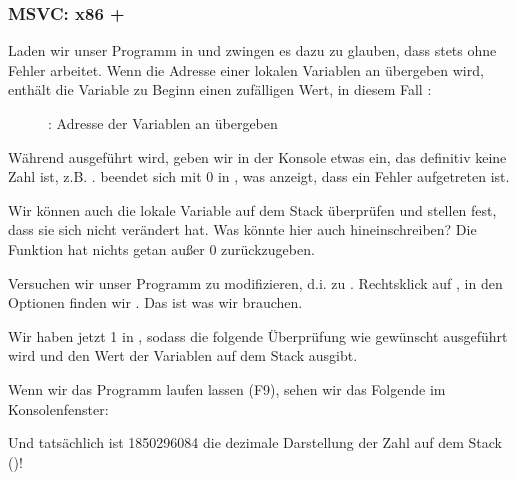 \clearpage
\subsubsection{MSVC: x86 + \olly}
Laden wir unser Programm in \olly und zwingen es dazu zu glauben, dass \scanf stets ohne Fehler arbeitet.
Wenn die Adresse einer lokalen Variablen an \scanf übergeben wird, enthält die Variable zu Beginn einen zufälligen Wert,
in diesem Fall :

\begin{figure}[H]
\centering
{}
\caption{\olly: Adresse der Variablen an \scanf übergeben}
\label{fig:scanf_ex3_olly_1}
\end{figure}

\clearpage
Während \scanf ausgeführt wird, geben wir in der Konsole etwas ein, das definitiv keine Zahl ist, z.B. .
\scanf beendet sich mit 0 in \EAX, was anzeigt, dass ein Fehler aufgetreten ist.

Wir können auch die lokale Variable auf dem Stack überprüfen und stellen fest, dass sie sich nicht verändert hat.
Was könnte \scanf hier auch hineinschreiben? Die Funktion hat nichts getan außer 0 zurückzugeben.

Versuchen wir unser Programm zu modifizieren, d.i. zu .
Rechtsklick auf \EAX, in den Optionen finden wir . Das ist was wir brauchen.

Wir haben jetzt 1 in \EAX, sodass die folgende Überprüfung wie gewünscht ausgeführt wird und \printf den Wert der
Variablen auf dem Stack ausgibt.

Wenn wir das Programm laufen lassen (F9), sehen wir das Folgende im Konsolenfenster:



Und tatsächlich ist 1850296084 die dezimale Darstellung der Zahl auf dem Stack ()!
